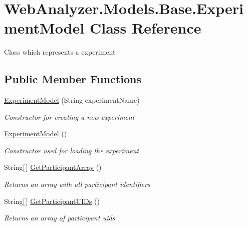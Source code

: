 \hypertarget{class_web_analyzer_1_1_models_1_1_base_1_1_experiment_model}{}\section{Web\+Analyzer.\+Models.\+Base.\+Experiment\+Model Class Reference}
\label{class_web_analyzer_1_1_models_1_1_base_1_1_experiment_model}


Class which represents a experiment  


\subsection*{Public Member Functions}
\begin{DoxyCompactItemize}
\item 
\hyperlink{class_web_analyzer_1_1_models_1_1_base_1_1_experiment_model_a64aa31d07212ecda87fd557c051ea529}{Experiment\+Model} (String experiment\+Name)
\begin{DoxyCompactList}\small\item\em Constructor for creating a new experiment \end{DoxyCompactList}\item 
\hyperlink{class_web_analyzer_1_1_models_1_1_base_1_1_experiment_model_a261ba587472913ad4f34f60c13ee3904}{Experiment\+Model} ()
\begin{DoxyCompactList}\small\item\em Constructor used for loading the experiment \end{DoxyCompactList}\item 
String\mbox{[}$\,$\mbox{]} \hyperlink{class_web_analyzer_1_1_models_1_1_base_1_1_experiment_model_af7a368e96b98082d8b878222dbcac372}{Get\+Participant\+Array} ()
\begin{DoxyCompactList}\small\item\em Returns an array with all participant identifiers \end{DoxyCompactList}\item 
String\mbox{[}$\,$\mbox{]} \hyperlink{class_web_analyzer_1_1_models_1_1_base_1_1_experiment_model_a6199a670aff6e00209ed3fdaa7020ecd}{Get\+Participant\+U\+I\+Ds} ()
\begin{DoxyCompactList}\small\item\em Returns an array of participant uids \end{DoxyCompactList}\item 

\end{DoxyCompactItemize}
